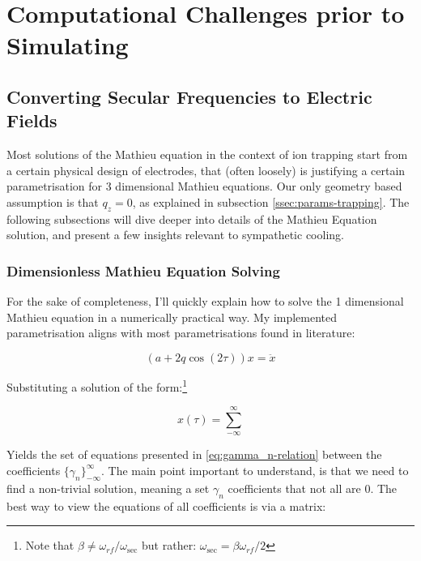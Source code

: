 \chapter{Computational Challenges prior to Simulating}

\section{Converting Secular Frequencies to Electric Fields}\label{sec:comp/freqs2aq}

Most solutions of the Mathieu equation in the context of ion trapping start from a certain physical design of electrodes, that (often loosely\cite{AkermanThesis}) is justifying a certain parametrisation for 3 dimensional Mathieu equations. Our only geometry based assumption is that $q_z = 0$, as explained in subsection \ref{ssec:params-trapping}. The following subsections will dive deeper into details of the Mathieu Equation solution, and present a few insights relevant to sympathetic cooling. 

\subsection{Dimensionless Mathieu Equation Solving}

For the sake of completeness, I'll quickly explain how to solve the 1 dimensional Mathieu equation in a numerically practical way. My implemented parametrisation aligns with most parametrisations found in literature:

\begin{equation}
	(a + 2 q \cos(2 \tau)) x = \ddot{x}
	\label{eq:bare-mathieu}
\end{equation}

Substituting a solution of the form:\footnote{Note that $\beta \ne \omega_{rf}/\omega_\mathrm{sec}$ but rather: $\omega_\mathrm{sec} = \beta \omega_{rf}/2$}

$$x(\tau) = \sum_{-\infty}^\infty $$

Yields the set of equations presented in \ref{eq:gamma_n-relation} between the coefficients $\{\gamma_n\}_{-\infty}^\infty$. The main point important to understand, is that we need to find a non-trivial solution, meaning a set $\gamma_n$ coefficients that not all are $0$. The best way to view the equations of all coefficients is via a matrix:

